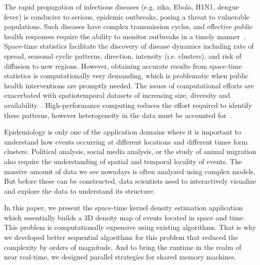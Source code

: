 \documentclass{article}
\begin{document}
The rapid propagation of infectious diseases (e.g. zika, Ebola, H1N1,
dengue fever) is conducive to serious, epidemic outbreaks, posing a
threat to vulnerable populations. Such diseases have complex
transmission cycles, and effective public health responses require the
ability to monitor outbreaks in a timely
manner~\cite{eisen2011using}. Space-time statistics facilitate the
discovery of disease dynamics including rate of spread, seasonal
cyclic patterns, direction, intensity (i.e. clusters), and risk of
diffusion to new regions.  However, obtaining accurate results from
space-time statistics is computationally very demanding, which is
problematic when public health interventions are promptly needed. The
issues of computational efforts are exacerbated with spatiotemporal
datasets of increasing size, diversity and
availability~\cite{grubesic2014spatial}. High-performance computing
reduces the effort required to identify these patterns, however
heterogeneity in the data must be accounted for~\cite{Hohl16}. 


Epidemiology is only one of the application domains where it is
important to understand how events occurring at different locations and
different times form clusters. Political analysis, social media
analysis, or the study of animal migration also require the
understanding of spatial and temporal locality of events. The massive
amount of data we see nowadays is often analyzed using complex
models. But before these can be constructed, data scientists  need to
interactively visualize and explore the data to understand its
structure. 

%
In this paper, we present the space-time kernel density estimation
application which essentially builds a 3D density map of events
located in space and time. This problem is computationally expensive
using existing algorithms. That is why we developed better sequential
algorithms for this problem that reduced the complexity by orders of
magnitude. And to bring the runtime in the realm of near real-time, we
designed parallel strategies for shared memory machines.
\end{document}
